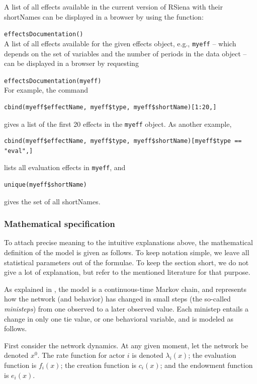 \documentclass[a4paper,fleqn,11pt]{article}
\newcommand{\+}{\, + \,}
\newcommand{\sfn}[1]{\textsf{#1}}
\newcommand{\RS}{{\sf \textsf{RSiena} }}
\begin{document}
A list of all effects available in the current version of
\RS with their \sfn{shortName}s can be displayed in a browser
by using the function:

\verb|effectsDocumentation()| \\

A list of all effects available for the given effects object, e.g.,
\texttt{myeff} -- which depends on the set of variables and the number of periods
in the data object --  can be displayed in a browser
by requesting

\verb|effectsDocumentation(myeff)| \\

For example, the command
\begin{verbatim}
cbind(myeff$effectName, myeff$type, myeff$shortName)[1:20,]
\end{verbatim}
gives a list of the first 20 effects in the \texttt{myeff} object.
As another example,
\begin{verbatim}
cbind(myeff$effectName, myeff$type, myeff$shortName)[myeff$type == "eval",]
\end{verbatim}
lists all evaluation effects in \texttt{myeff},
and
\begin{verbatim}
unique(myeff$shortName)
\end{verbatim}
gives the set of all \sfn{shortName}s.

\subsubsection{Mathematical specification}
\label{S_mathmod}

To attach precise meaning to the intuitive explanations above,
the mathematical definition of the model is given as follows.
To keep notation simple, we leave all statistical parameters out of the
formulae. To keep the section short, we do not give a lot of explanation,
but refer to the mentioned literature for that purpose.

As explained in \citet*{SnijdersEA10b}, the model is a continuous-time
Markov chain, and represents how the network (and behavior) has changed
in small steps (the so-called \emph{ministeps}) from one observed
to a later observed value. Each ministep entails a change in only
one tie value, or one behavioral variable, and is modeled as follows.

First consider the network dynamics.
At any given moment, let the network be denoted $x^0$.
The rate function for actor $i$ is denoted $\lambda_i(x)$;
the evaluation function is $f_i(x)$; the creation function is $c_i(x)$;
and the endowment function is $e_i(x)$.
\end{document}

